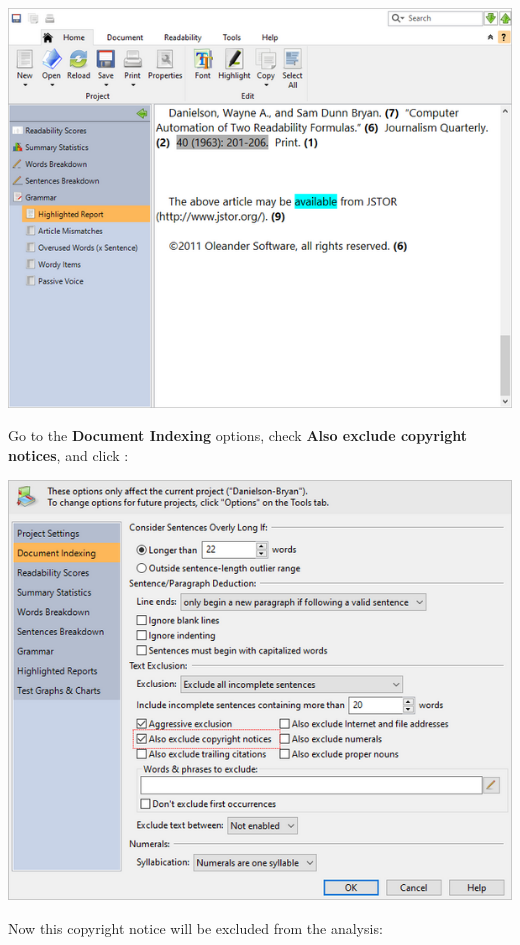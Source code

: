 \documentclass[
]{book}
\theoremstyle{definition}
\theoremstyle{definition}
\theoremstyle{definition}
\theoremstyle{definition}
\theoremstyle{remark}
\begin{document}
\includegraphics{Images/ExclusionExampleCopyrightIncluded.png}

Go to the \textbf{Document Indexing} options, check \textbf{Also exclude copyright notices}, and click :

\includegraphics{Images/ExclusionExampleCopyrightExcluded.png}

Now this copyright notice will be excluded from the analysis:
\end{document}
